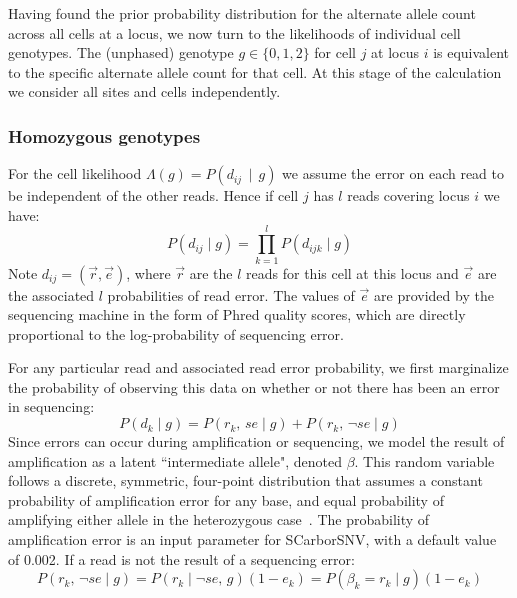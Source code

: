 \documentclass[../../main.tex]{subfiles}
\begin{document}

Having found the prior probability distribution for the alternate allele count across all cells at a locus, we now turn to the likelihoods of individual cell genotypes.
The (unphased) genotype $g\in\{0,1,2\}$ for cell $j$ at locus $i$ is equivalent to the specific alternate allele count for that cell.
At this stage of the calculation we consider all sites and cells independently.
\subsubsection*{Homozygous genotypes}
For the cell likelihood $\Lambda(g) = P(d_{ij}\,\mid\,g)$ we assume the error on each read to be independent of the other reads.
Hence if cell $j$ has $l$ reads covering locus $i$ we have:
\begin{equation*}
    P(d_{ij}\mid g) = \prod_{k=1}^l P(d_{ijk} \mid g)
\end{equation*}
Note $d_{ij}=(\vec{r},\vec{e})$, where $\vec{r}$ are the $l$ reads for this cell at this locus and $\vec{e}$ are the associated $l$ probabilities of read error.
The values of $\vec{e}$ are provided by the sequencing machine in the form of Phred quality scores, which are directly proportional to the log-probability of sequencing error. 

For any particular read and associated read error probability, we first marginalize the probability of observing this data on whether or not there has been an error in sequencing:
\begin{equation*}
    P(d_{k} \mid g) =  P(r_k,\,se \mid g) + P(r_k,\,\neg se \mid g)
\end{equation*}
Since errors can occur during amplification or sequencing, we model the result of amplification as a latent ``intermediate allele", denoted $\beta$.
This random variable follows a discrete, symmetric, four-point distribution that assumes a constant probability of amplification error for any base, and equal probability of amplifying either allele in the heterozygous case~\cite{monovar}.
The probability of amplification error is an input parameter for SCarborSNV, with a default value of 0.002.
If a read is not the result of a sequencing error:
\begin{equation*}
    P(r_k,\,\neg se \mid g) = P(r_k\mid \neg se ,\, g)(1-e_k)=P(\beta_k=r_k\mid g)(1-e_k) 
\end{equation*}
\end{document}
